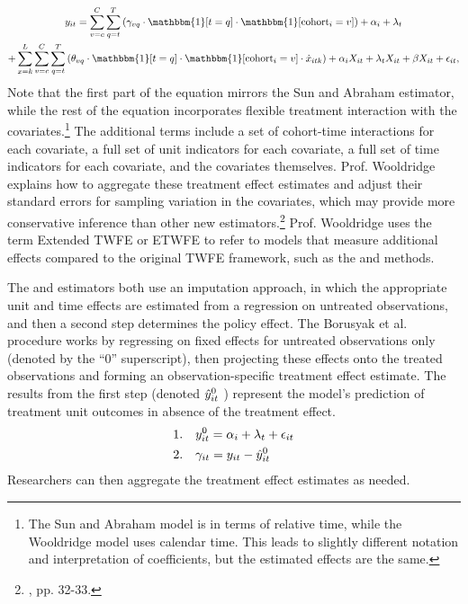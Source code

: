 \documentclass[12pt]{article}
\begin{document}
\begin{multline}
    y_{it} = \sum_{v=c}^C\sum_{q=t}^T\left(\gamma_{vq}\cdot\mathbbm{1}[t=q]\cdot \mathbbm{1}[\text{cohort}_i=v]\right) + \alpha_i + \lambda_t \\
    + \sum_{x=k}^L\sum_{v=c}^C\sum_{q=t}^T\left(\theta_{vq}\cdot \mathbbm{1}[t=q]\cdot \mathbbm{1}[\text{cohort}_i=v] \cdot \dot{x}_{itk}\right) + \alpha_i X_{it} + \lambda_t X_{it} + \beta X_{it} +\epsilon_{it},
\end{multline}
Note that the first part of the equation mirrors the Sun and Abraham estimator, while the rest of the equation incorporates flexible treatment interaction with the covariates.\footnote{The Sun and Abraham model is in terms of relative time, while the Wooldridge model uses calendar time. This leads to slightly different notation and interpretation of coefficients, but the estimated effects are the same.}  The additional terms include a set of cohort-time interactions for each covariate, a full set of unit indicators for each covariate, a full set of time indicators for each covariate, and the covariates themselves. Prof. Wooldridge explains how to aggregate these treatment effect estimates and adjust their standard errors for sampling variation in the covariates, which may provide more conservative inference than other new estimators.\footnote{\citet{wooldridge2021two}, pp. 32-33.} Prof. Wooldridge uses the term Extended TWFE or ETWFE to refer to models that measure additional effects compared to the original TWFE framework, such as the \citet{sunabr2021a} and \citet{wooldridge2021two} methods.

The \citet{borusyak2024revisiting} and \citet{gardner2022a} estimators both use an imputation approach, in which the appropriate unit and time effects are estimated from a regression on untreated observations, and then a second step determines the policy effect. The Borusyak et al. procedure works by regressing on fixed effects for untreated observations only (denoted by the “0” superscript), then projecting these effects onto the treated observations and forming an observation-specific treatment effect estimate. The results from the first step (denoted $\Hat{y}_{it}^0$ ) represent the model’s prediction of treatment unit outcomes in absence of the treatment effect.
\begin{align}
    1. \quad & y_{it}^0 = \alpha_i + \lambda_t + \epsilon_{it} \\
    2. \quad & \gamma_{it} = y_{it} - \Hat{y}_{it}^0
\end{align}
Researchers can then aggregate the treatment effect estimates as needed.
\end{document}
